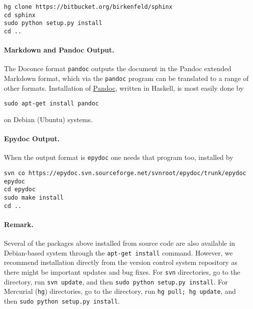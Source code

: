 \documentclass[%
oneside,                 %
final,                   %
10pt]{article}
\begin{document}
\vspace{4pt}
\begin{Verbatim}[numbers=none,frame=lines,label=\fbox{{\tiny Terminal}},fontsize=\fontsize{9pt}{9pt},
labelposition=topline,framesep=2.5mm,framerule=0.7pt]
hg clone https://bitbucket.org/birkenfeld/sphinx
cd sphinx
sudo python setup.py install
cd ..
\end{Verbatim}

\paragraph{Markdown and Pandoc Output.}
The Doconce format {\fontsize{10pt}{10pt}\Verb!pandoc!} outputs the document in the Pandoc
extended Markdown format, which via the {\fontsize{10pt}{10pt}\Verb!pandoc!} program can be
translated to a range of other formats. Installation of \href{{http://johnmacfarlane.net/pandoc/}}{Pandoc}, written in Haskell, is most
easily done by

\vspace{4pt}
\begin{Verbatim}[numbers=none,frame=lines,label=\fbox{{\tiny Terminal}},fontsize=\fontsize{9pt}{9pt},
labelposition=topline,framesep=2.5mm,framerule=0.7pt]
sudo apt-get install pandoc
\end{Verbatim}
on Debian (Ubuntu) systems.

\paragraph{Epydoc Output.}
When the output format is {\fontsize{10pt}{10pt}\Verb!epydoc!} one needs that program too, installed
by
\vspace{4pt}
\begin{Verbatim}[numbers=none,frame=lines,label=\fbox{{\tiny Terminal}},fontsize=\fontsize{9pt}{9pt},
labelposition=topline,framesep=2.5mm,framerule=0.7pt]
svn co https://epydoc.svn.sourceforge.net/svnroot/epydoc/trunk/epydoc epydoc
cd epydoc
sudo make install
cd ..
\end{Verbatim}

\paragraph{Remark.}
Several of the packages above installed from source code
are also available in Debian-based system through the
{\fontsize{10pt}{10pt}\Verb!apt-get install!} command. However, we recommend installation directly
from the version control system repository as there might be important
updates and bug fixes. For {\fontsize{10pt}{10pt}\Verb!svn!} directories, go to the directory,
run {\fontsize{10pt}{10pt}\Verb!svn update!}, and then {\fontsize{10pt}{10pt}\Verb!sudo python setup.py install!}. For
Mercurial ({\fontsize{10pt}{10pt}\Verb!hg!}) directories, go to the directory, run
{\fontsize{10pt}{10pt}\Verb!hg pull; hg update!}, and then {\fontsize{10pt}{10pt}\Verb!sudo python setup.py install!}.

\printindex
\end{document}
